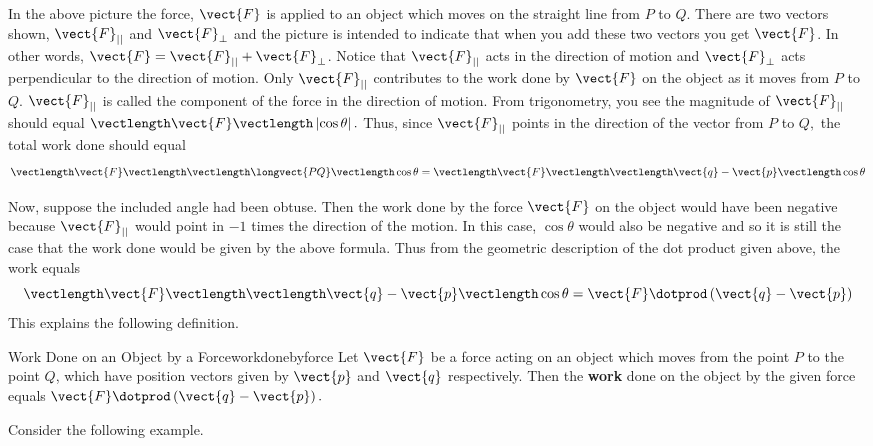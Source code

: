 In the above picture the force, $\vect{F}$ is applied to an object which moves
on the straight line from $P$ to $Q.$ There are two vectors shown, $\vect{F}_{||}$ and $\vect{F}_{\bot }$ and the
picture is intended to indicate that when you add these two vectors you get 
$\vect{F}$. In other words, $\vect{F} = \vect{F}_{||} + \vect{F}_{\bot}$. Notice that
 $\vect{F}_{||}$ acts in the direction of motion and 
$\vect{F}_{\bot }$ acts perpendicular to the direction of motion. Only 
$\vect{F}_{||}$ contributes to the work done by $\vect{F}$ on the object
as it moves from $P$ to $Q$. $\vect{F}_{||}$ is
called the component of the force in
 the direction of motion. From trigonometry, you
see the magnitude of $\vect{F}_{||}$ should equal $\vectlength \vect{F}
\vectlength \left| \cos \theta \right| .$ Thus, since $\vect{F}_{||}$ points
in the direction of the vector from $P$ to $Q,$
the total work done should equal
\begin{equation*}
\vectlength \vect{F}\vectlength \vectlength
\longvect{PQ}\vectlength \cos \theta =\vectlength
\vect{F}\vectlength \vectlength \vect{q}-\vect{p}\vectlength \cos \theta
\end{equation*}

Now, suppose the included angle had been obtuse. Then the work done by the force 
$\vect{F}$ on the object would have been negative because $\vect{F}_{||}$
would point in $-1$ times the direction of the motion.  In this case, $\cos \theta $ would also be negative and 
so it is still
the case that the work done would be given by the above formula. Thus from
the geometric description of the dot product given above, the work equals
\begin{equation*}
\vectlength \vect{F}\vectlength \vectlength \vect{q}-\vect{p}\vectlength \cos
\theta =\vect{F}\dotprod \left( \vect{q}-\vect{p}\right) 
\end{equation*}
This explains the following definition.

\begin{definition}{Work Done on an Object by a Force}{workdonebyforce}
Let $\vect{F}$ be a force acting on an object which moves from the point 
$P$ to the point $Q$, which have position vectors given by $\vect{p}$ and $\vect{q}$ respectively.
 Then the \textbf{work} done
 on the object by the given force equals $\vect{F}\dotprod \left(
\vect{q}-\vect{p}\right) .$
\end{definition}

Consider the following example.

